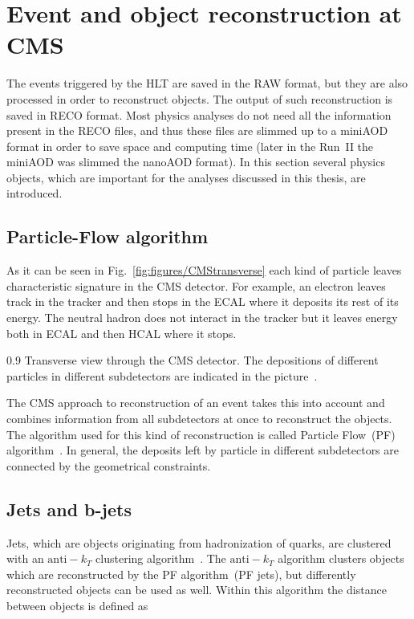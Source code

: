 \newpage

\section{Event and object reconstruction at CMS~\label{sec:objects}}

The events triggered by the HLT are saved in the RAW format, but they are also processed in order to reconstruct objects. The output of such reconstruction is saved in RECO format. Most physics analyses do not need all the information present in the RECO files, and thus these files are slimmed up to a miniAOD~\cite{Petrucciani:2029414} format in order to save space and computing time (later in the Run~II the miniAOD was slimmed the nanoAOD format). In this section several physics objects, which are important for the analyses discussed in this thesis, are introduced.


\subsection{Particle-Flow algorithm}

As it can be seen in Fig.~\ref{fig:figures/CMStransverse} each kind of particle leaves characteristic signature in the CMS detector. For example, an electron leaves track in the tracker and then stops in the ECAL where it deposits its rest of its energy. The neutral hadron does not interact in the tracker but it leaves energy both in ECAL and then HCAL where it stops.

                 {0.9}       %
                 { Transverse view through the CMS detector. The depositions of different particles in different subdetectors are indicated in the picture~\cite{Sirunyan:2017ulk}. }

The CMS approach to reconstruction of an event takes this into account and combines information from all subdetectors at once to reconstruct the objects. The algorithm used for this kind of reconstruction is called Particle Flow~(PF) algorithm~\cite{Sirunyan:2017ulk}. In general, the deposits left by particle in different subdetectors are connected by the geometrical constraints.

\subsection{Jets and b-jets}

Jets, which are objects originating from hadronization of quarks, are clustered with an $\mathrm{anti-}k_{T}$ clustering algorithm~\cite{Cacciari:2008gp}. The $\mathrm{anti-}k_{T}$ algorithm clusters objects which are reconstructed by the PF algorithm~(PF jets), but differently reconstructed objects can be used as well. Within this algorithm the distance between objects is defined as

